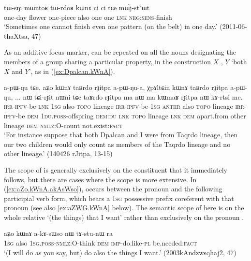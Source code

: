 \begin{exe}
\ex \label{ex:tWrdoR.kWnA}
\gll tɯ-sŋi mɯntoʁ tɯ-rdoʁ kɯnɤ ci ci tɕe mɯ́j-stʰɯt \\
one-day flower one-piece also one one \textsc{lnk} \textsc{neg}:\textsc{sens}-finish \\
\glt `Sometimes one cannot finish even one pattern (on the belt) in one day.' (2011-06-thaXtsa, 47)
\end{exe}

As an additive focus marker,  can be repeated on all the nouns designating the members of a group sharing a particular property, in the construction $X$ , $Y$   `both $X$ and $Y$', as in (\ref{ex:Dpalcan.kWnA}).

\begin{exe}
\ex \label{ex:Dpalcan.kWnA}
 \gll a-pɯ-ŋu tɕe, aʑo kɯnɤ taʁrdo rɟitpa a-pɯ-ŋu-a, χpɤltɕin kɯnɤ taʁrdo rɟitpa a-pɯ-ŋu, ... nɯ tɕi-rɟit nɯni tɕe taʁrdo rɟitpa ma nɯ ma kɯmaʁ rɟitpa nɯ kɤ-rtsi me.  \\
 \textsc{irr}-\textsc{ipfv}-be \textsc{lnk} \textsc{1sg} also  \textsc{topo} lineage  \textsc{irr}-\textsc{ipfv}-be-\textsc{1sg}   \textsc{anthr} also  \textsc{topo} lineage  \textsc{irr}-\textsc{ipfv}-be { } \textsc{dem} \textsc{1du}.\textsc{poss}-offspring \textsc{dem}:\textsc{du} \textsc{lnk}  \textsc{topo} lineage \textsc{lnk} \textsc{dem} apart.from other lineage \textsc{dem} \textsc{nmlz}:O-count not.exist:\textsc{fact} \\
 \glt `For instance suppose that both Dpalcan and I were from Taqrdo lineage, then our two children would only count as members of the Taqrdo lineage and no other lineage.' (140426 rJitpa, 13-15)
\end{exe}

The scope of   is generally exclusively on the constituent that it immediately follows, but there are cases where the scope is more extensive. In (\ref{ex:aZo.kWnA.akAsWso}),  occurs between the pronoun  and the following participial verb form, which bears a \textsc{1sg} possessive prefix  coreferent with that pronoun (see also \ref{ex:aZWG.kWnA} below). The semantic scope of  here is on the whole relative  `(the things) that I want' rather than exclusively on the pronoun .

\begin{exe}
\ex \label{ex:aZo.kWnA.akAsWso}
 \gll aʑo kɯnɤ a-kɤ-sɯso nɯ tɤ-stu-nɯ ra \\
 \textsc{1sg} also \textsc{1sg}.\textsc{poss}-\textsc{nmlz}:O-think \textsc{dem} \textsc{imp}-do.like-\textsc{pl} be.needed:\textsc{fact} \\
 \glt `(I will do as you say, but) do also the things I want.' (2003kAndzwsqhaj2, 47)
\end{exe}

